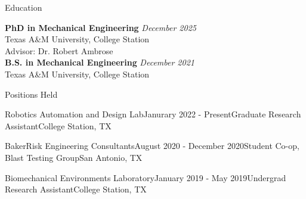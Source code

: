 \documentclass[
	11pt, %
]{resume} %
\begin{document}
\begin{rSection}{Education}

	\textbf{PhD in Mechanical Engineering} \hfill \textit{December 2025} \\          
    Texas A\&M University, College Station\\ 
	Advisor: Dr. Robert Ambrose \smallskip\\
	\textbf{B.S. in Mechanical Engineering} \hfill \textit{December 2021} \\ 
	 Texas A\&M University, College Station\\
	
\end{rSection}

\begin{rSection}{Positions Held}
    \begin{rSubsectionWorkList}{Robotics Automation and Design Lab}{Janurary 2022 - Present}{Graduate Research Assistant}{College Station, TX}
    \end{rSubsectionWorkList}
    \begin{rSubsectionWorkList}{BakerRisk Engineering Consultants}{August 2020 - December 2020}{Student Co-op, Blast Testing Group}{San Antonio, TX}
    \end{rSubsectionWorkList}
    \begin{rSubsectionWorkList}{Biomechanical Environments Laboratory}{January 2019 - May 2019}{Undergrad Research Assistant}{College Station, TX}
    \end{rSubsectionWorkList}
\end{rSection}
\end{document}
